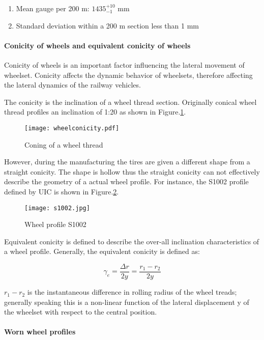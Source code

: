 \begin{enumerate}
\item Mean gauge per 200 m: $1435^{+10}_{-1}$ mm
\item Standard deviation within a 200 m section less than 1 mm
\end{enumerate}

\paragraph{Conicity of wheels and equivalent conicity of wheels}

Conicity of wheels is an important factor influencing the lateral movement of wheelset. Conicity affects the dynamic behavior of wheelsets, therefore affecting the lateral dynamics of the railway vehicles.

The conicity is the inclination of a wheel thread section. Originally conical wheel thread profiles an inclination of 1:20 as shown in Figure.\ref{fig:wheelconicity}. 

\begin{figure}[h!]
	\centering
	\texttt{[image: wheelconicity.pdf]}
	\caption{Coning of a wheel thread}
	\label{fig:wheelconicity}
\end{figure}

However, during the manufacturing the tires are given a different shape from a straight conicity. The shape is hollow thus the straight conicity can not effectively describe the geometry of a actual wheel profile. For instance, the S1002 profile defined by UIC is shown in Figure.\ref{fig:s1002}.

\begin{figure}[h!]
	\centering
	\texttt{[image: s1002.jpg]}
	\caption{Wheel profile S1002}
	\label{fig:s1002}
\end{figure}

Equivalent conicity is defined to describe the over-all inclination characteristics of a wheel profile. Generally, the equivalent conicity is defined as\cite{esveld2001modern}:

$$ \gamma_e = \frac{\Delta r}{2y} = \frac{r_1 - r_2}{2y}  $$

$r_1 - r_2$ is the instantaneous difference in rolling radius of the wheel treads; generally speaking this is a non-linear function of the lateral displacement y of the wheelset with respect to the central position. 

\paragraph{Worn wheel profiles}

